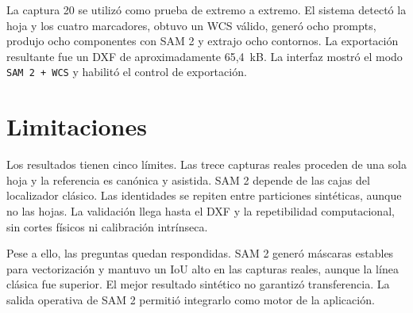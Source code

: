 La captura 20 se utilizó como prueba de extremo a extremo. El sistema detectó la hoja y los cuatro marcadores, obtuvo un WCS válido, generó ocho prompts, produjo ocho componentes con SAM 2 y extrajo ocho contornos. La exportación resultante fue un DXF de aproximadamente 65,4~kB. La interfaz mostró el modo \texttt{SAM 2 + WCS} y habilitó el control de exportación.

\section{Limitaciones}

Los resultados tienen cinco límites. Las trece capturas reales proceden de una sola hoja y la referencia es canónica y asistida. SAM 2 depende de las cajas del localizador clásico. Las identidades se repiten entre particiones sintéticas, aunque no las hojas. La validación llega hasta el DXF y la repetibilidad computacional, sin cortes físicos ni calibración intrínseca.

Pese a ello, las preguntas quedan respondidas. SAM 2 generó máscaras estables para vectorización y mantuvo un IoU alto en las capturas reales, aunque la línea clásica fue superior. El mejor resultado sintético no garantizó transferencia. La salida operativa de SAM 2 permitió integrarlo como motor de la aplicación.
